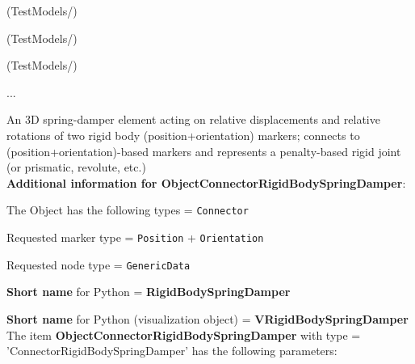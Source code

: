 \item {} (TestModels/)
\item {} (TestModels/)
\item {} (TestModels/)
\item  ...

\ei

%
\newpage

\label{sec:item:ObjectConnectorRigidBodySpringDamper}
An 3D spring-damper element acting on relative displacements and relative rotations of two rigid body (position+orientation) markers; connects to (position+orientation)-based markers and represents a penalty-based rigid joint (or prismatic, revolute, etc.)\vspace{12pt}
 \\{\bf Additional information for ObjectConnectorRigidBodySpringDamper}:
\bi
  \item The Object has the following types = \texttt{Connector}
  \item Requested marker type = \texttt{Position} + \texttt{Orientation}
  \item Requested node type = \texttt{GenericData}
  \item {\bf Short name} for Python = {\bf RigidBodySpringDamper}  \item {\bf Short name} for Python (visualization object) = {\bf VRigidBodySpringDamper}\ei
\vspace{12pt} \noindent The item {\bf ObjectConnectorRigidBodySpringDamper} with type = 'ConnectorRigidBodySpringDamper' has the following parameters:\vspace{-1cm}\\ 
